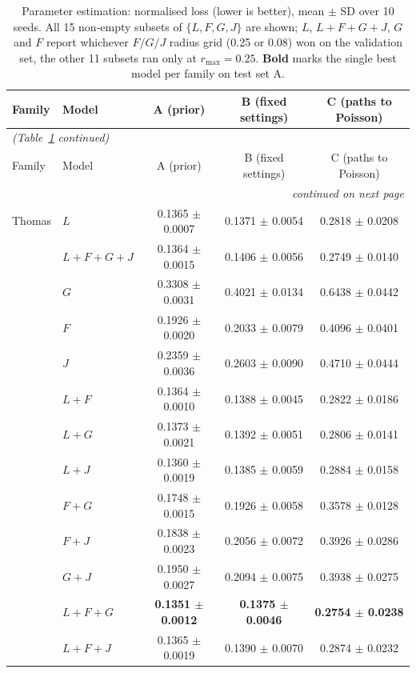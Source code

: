 \documentclass[10pt,a4paper]{article}
\newcommand{\B}[1]{\textbf{#1}}
\begin{document}
\begin{longtable}{@{}ll ccc@{}}
\caption{Parameter estimation: normalised loss (lower is better), mean $\pm$ SD over 10 seeds. All 15 non-empty subsets of $\{L,F,G,J\}$ are shown; $L$, $L{+}F{+}G{+}J$, $G$ and $F$ report whichever $F/G/J$ radius grid (0.25 or 0.08) won on the validation set, the other 11 subsets ran only at $r_{\max}=0.25$. \textbf{Bold} marks the single best model per family on test set A.}
\label{tab:params}\\
\toprule
Family & Model & A (prior) & B (fixed settings) & C (paths to Poisson)\\
\midrule
\endfirsthead
\multicolumn{5}{l}{\small\slshape (Table~\ref{tab:params} continued)}\\
\toprule
Family & Model & A (prior) & B (fixed settings) & C (paths to Poisson)\\
\midrule
\endhead
\midrule
\multicolumn{5}{r}{\small\slshape continued on next page}\\
\endfoot
\bottomrule
\endlastfoot
Thomas & $L$ & 0.1365 $\pm$ 0.0007 & 0.1371 $\pm$ 0.0054 & 0.2818 $\pm$ 0.0208\\
 & $L{+}F{+}G{+}J$ & 0.1364 $\pm$ 0.0015 & 0.1406 $\pm$ 0.0056 & 0.2749 $\pm$ 0.0140\\
 & $G$ & 0.3308 $\pm$ 0.0031 & 0.4021 $\pm$ 0.0134 & 0.6438 $\pm$ 0.0442\\
 & $F$ & 0.1926 $\pm$ 0.0020 & 0.2033 $\pm$ 0.0079 & 0.4096 $\pm$ 0.0401\\
 & $J$ & 0.2359 $\pm$ 0.0036 & 0.2603 $\pm$ 0.0090 & 0.4710 $\pm$ 0.0444\\
 & $L{+}F$ & 0.1364 $\pm$ 0.0010 & 0.1388 $\pm$ 0.0045 & 0.2822 $\pm$ 0.0186\\
 & $L{+}G$ & 0.1373 $\pm$ 0.0021 & 0.1392 $\pm$ 0.0051 & 0.2806 $\pm$ 0.0141\\
 & $L{+}J$ & 0.1360 $\pm$ 0.0019 & 0.1385 $\pm$ 0.0059 & 0.2884 $\pm$ 0.0158\\
 & $F{+}G$ & 0.1748 $\pm$ 0.0015 & 0.1926 $\pm$ 0.0058 & 0.3578 $\pm$ 0.0128\\
 & $F{+}J$ & 0.1838 $\pm$ 0.0023 & 0.2056 $\pm$ 0.0072 & 0.3926 $\pm$ 0.0286\\
 & $G{+}J$ & 0.1950 $\pm$ 0.0027 & 0.2094 $\pm$ 0.0075 & 0.3938 $\pm$ 0.0275\\
 & \B{$L{+}F{+}G$} & \B{0.1351 $\pm$ 0.0012} & \B{0.1375 $\pm$ 0.0046} & \B{0.2754 $\pm$ 0.0238}\\
 & $L{+}F{+}J$ & 0.1365 $\pm$ 0.0019 & 0.1390 $\pm$ 0.0070 & 0.2874 $\pm$ 0.0232\\

\end{longtable}
\end{document}
